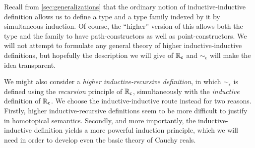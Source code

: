 Recall from \autoref{sec:generalizations} that the ordinary notion of inductive-inductive definition allows us to define a type and a type family indexed by it by simultaneous induction.
Of course, the ``higher'' version of this allows both the type and the family to have path-constructors as well as point-constructors.
We will not attempt to formulate any general theory of higher inductive-inductive definitions, but hopefully the description we will give of $\mathbb{R}_\mathsf{c}$ and $\sim_\epsilon$ will make the idea transparent.

\begin{rmk}
  We might also consider a \emph{higher inductive-recursive definition}, in which $\sim_\epsilon$ is defined using the \emph{recursion} principle of $\mathbb{R}_\mathsf{c}$, simultaneously with the \emph{inductive} definition of $\mathbb{R}_\mathsf{c}$.
  We choose the inductive-inductive route instead for two reasons.
  Firstly, higher inductive-recursive definitions seem to be more difficult to justify in homotopical semantics.
  Secondly, and more importantly, the inductive-inductive definition yields a more powerful induction principle, which we will need in order to develop even the basic theory of Cauchy reals.
\end{rmk}

